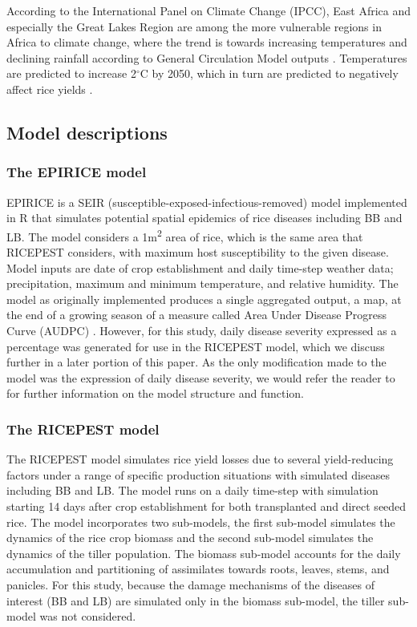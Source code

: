 \documentclass[preprint,review,12pt]{elsarticle}
\begin{document}
    According to the International Panel on Climate Change (IPCC), East Africa and especially the Great Lakes Region are among the more vulnerable regions in Africa to climate change, where the trend is towards increasing temperatures and declining rainfall according to General Circulation Model outputs \cite{Boko2007}. Temperatures are predicted to increase 2$^{\circ}$C by 2050, which in turn are predicted to negatively affect rice yields \cite{Rowhani2011}.
    
    \subsection{Model descriptions}
    \subsubsection{The EPIRICE model} 
    EPIRICE \cite{Savary2012} is a SEIR (susceptible-exposed-infectious-removed) model \cite{Kermack1927, Madden2006} implemented in R \cite{R2014} that simulates potential spatial epidemics of rice diseases including BB and LB. The model considers a 1m\textsuperscript{2} area of rice, which is the same area that RICEPEST considers, with maximum host susceptibility to the given disease. Model inputs are date of crop establishment and daily time-step weather data; precipitation, maximum and minimum temperature, and relative humidity. The model as originally implemented produces a single aggregated output, a map, at the end of a growing season of a measure called Area Under Disease Progress Curve (AUDPC) \cite{Shaner1977}. However, for this study, daily disease severity expressed as a percentage was generated for use in the RICEPEST model, which we discuss further in a later portion of this paper. As the only modification made to the model was the expression of daily disease severity, we  would refer the reader to \citet{Savary2012} for further information on the model structure and function.
    
    \subsubsection{The RICEPEST model}
    The RICEPEST model \cite{Willocquet2000, Willocquet2002} simulates rice yield losses due to several yield-reducing factors under a range of specific production situations with simulated diseases including BB and LB. The model runs on a daily time-step with simulation starting 14 days after crop establishment for both transplanted and direct seeded rice. The model incorporates two sub-models, the first sub-model simulates the dynamics of the rice crop biomass and the second sub-model simulates the dynamics of the tiller population. The biomass sub-model accounts for the daily accumulation and partitioning of assimilates towards roots, leaves, stems, and panicles. For this study, because the damage mechanisms of the diseases of interest (BB and LB) are simulated only in the biomass sub-model, the tiller sub-model was not considered.
    
\end{document}
